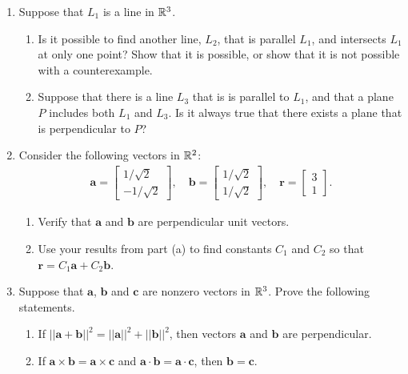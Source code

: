\documentclass{article}
\begin{document}
\begin{enumerate}
\item %
Suppose that $L_1$ is a line in $\mathbb{R}^3$.
\begin{enumerate}
\item Is it possible to find another line, $L_2$, that is parallel $L_1$, and intersects $L_1$ at only one point? Show that it is  possible, or show that it is not possible with a counterexample.
\item Suppose that there is a line $L_3$ that is is parallel to $L_1$, and that a plane $P$ includes both $L_1$ and $L_3$. Is it always true that there exists a plane that is perpendicular to $P$? 
\end{enumerate}
\item %
Consider the following vectors in $\mathbb{R}^2$:
\begin{align*}
\mathbf{a} = \begin{bmatrix} 1/\sqrt{2} \\ -1/\sqrt{2} \end{bmatrix}, \quad
\mathbf{b} = \begin{bmatrix} 1/\sqrt{2} \\ 1/\sqrt{2} \end{bmatrix}, \quad
\mathbf{r} =  \begin{bmatrix} 3 \\ 1 \end{bmatrix}.
\end{align*}
\begin{enumerate}
\item Verify that $\mathbf{a}$ and $\mathbf{b}$ are perpendicular unit vectors. 
\item Use your results from part (a) to find constants $C_1$ and $C_2$ so that $\mathbf{r}=C_1\mathbf{a}+C_2\mathbf{b}$.
\end{enumerate}
\item %
Suppose that $\mathbf{a}$, $\mathbf{b}$ and $\mathbf{c}$ are nonzero vectors in $\mathbb{R}^3$. Prove the following statements.
\begin{enumerate}
\item If $||\mathbf{a} + \mathbf{b}||^2 = ||\mathbf{a}||^2 + ||\mathbf{b}||^2$, then vectors $\mathbf{a}$ and $\mathbf{b}$ are perpendicular. 
\item If $\mathbf{a}\times\mathbf{b} = \mathbf{a}\times\mathbf{c}$ and $\mathbf{a}\cdot\mathbf{b} = \mathbf{a}\cdot\mathbf{c}$, then $\mathbf{b} =\mathbf{c}$.

\end{enumerate}
\end{enumerate}
\end{document}
